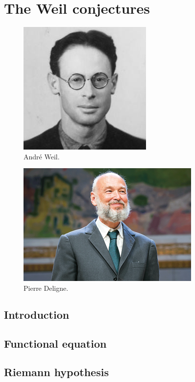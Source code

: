 \documentclass [11 pt, oneside, margin = 1 in] {article}
\begin{document}
\section{The Weil conjectures}

\begin{figure}
	\begin{center}
		\includegraphics[scale=0.8]{images/weil}
		\caption{Andr\'e Weil.}
	\end{center}
\end{figure}

\begin{figure}
	\begin{center}
		\includegraphics[scale=0.8]{images/deligne}
		\caption{Pierre Deligne.}
	\end{center}
\end{figure}

\subsection{Introduction}
\subsection{Functional equation}
\subsection{Riemann hypothesis}
\end{document}
